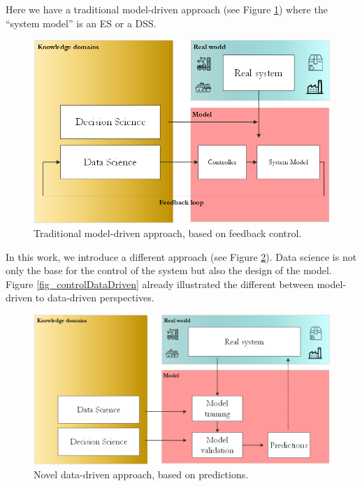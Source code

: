 Here we have a traditional model-driven approach (see Figure \ref{fig_controlAsIs}) where the “system model” is an ES or a DSS.

\begin{figure}[hbt!]
\centering
\includegraphics[width=1\textwidth]{SectionIntroduction/introduction_figures/fig_controlAsIs.png}
\captionsetup{type=figure}
\caption{Traditional model-driven approach, based on feedback control.}
\label{fig_controlAsIs}
\end{figure}

In this work, we introduce a different approach (see Figure \ref{fig_controlToBe}). Data science is not only the base for the control of the system but also the design of the model. Figure \ref{fig_controlDataDriven} already illustrated the different between model-driven to data-driven perspectives.

\begin{figure}[hbt!]
\centering
\includegraphics[width=1\textwidth]{SectionIntroduction/introduction_figures/fig_controlToBe.png}
\captionsetup{type=figure}
\caption{Novel data-driven approach, based on predictions.}
\label{fig_controlToBe}
\end{figure}

